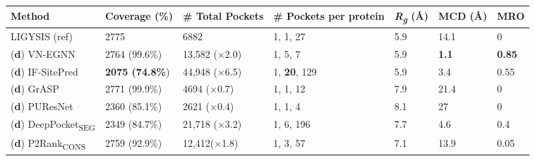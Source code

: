 \begin{landscape}
\begin{longtable}[c]{|M{30mm}|M{29mm}|M{29mm}|M{41mm}|M{26mm}|M{26mm}|M{20mm}|}
\hline
\textbf{Method}        & \textbf{Coverage} (\%)    & \textbf{\# Total Pockets}  & \textbf{\# Pockets per protein} & \textbf{\textit{R\textsubscript{g}}} (\AA{}) & \textbf{MCD} (\AA{}) & \textbf{MRO}  \\ \hline
\endfirsthead
%
\endhead
%
LIGYSIS \footnotesize{(ref)}      & 2775          & 6882          & 1, 1, 27            & 5.9                              & 14.1                         & 0    \\ \hline
\footnotesize{(\textbf{d})} VN-EGNN       & 2764 (99.6\%)   & 13,582 ($\times$2.0) & 1, 5, 7             & 5.9                              & \textbf{1.1}                          & \textbf{0.85} \\ \hline
\footnotesize{(\textbf{d})} IF-SitePred   & \textbf{2075 (74.8\%}) & 44,948 ($\times$6.5) & 1, \textbf{20}, 129          & 5.9                              & 3.4                          & 0.55 \\ \hline
\footnotesize{(\textbf{d})} GrASP         & 2771 (99.9\%) & 4694 ($\times$0.7)  & 1, 1, 12            & 7.9                              & 21.4                         & 0    \\ \hline
\footnotesize{(\textbf{d})} PUResNet      & 2360 (85.1\%) & 2621 ($\times$0.4)  & 1, 1, 4             & 8.1                              & 27                           & 0    \\ \hline
\footnotesize{(\textbf{d})} DeepPocket\textsubscript{SEG} & 2349 (84.7\%) & 21,718 ($\times$3.2) & 1, 6, 196           & 7.7                              & 4.6                          & 0.4  \\ \hline
\footnotesize{(\textbf{d})} P2Rank\textsubscript{CONS}    & 2759 (92.9\%) & 12,412($\times$1.8)  & 1, 3, 57            & 7.1                              & 13.9                         & 0.05 \\ \hline

\end{longtable}
\end{landscape}
